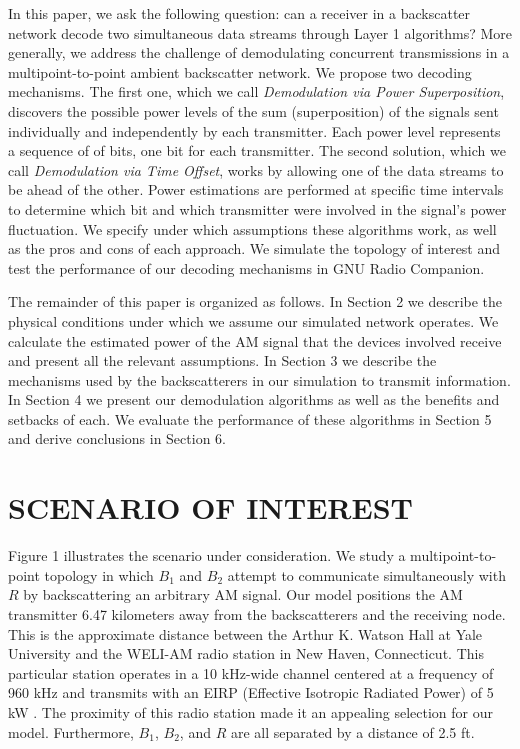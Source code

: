 \documentclass[letterpaper, 10 pt, conference]{IEEEconf}
\begin{document}
In this paper, we ask the following question: can a receiver in a backscatter network decode two simultaneous data streams through Layer 1 algorithms? More generally, we address the challenge of demodulating concurrent transmissions in a multipoint-to-point ambient backscatter network. We propose two decoding mechanisms. The first one, which we call \textit{Demodulation via Power Superposition}, discovers the possible power levels of the sum (superposition) of the signals sent individually and independently by each transmitter. Each power level represents a sequence of of bits, one bit for each transmitter. The second solution, which we call \textit{Demodulation via Time Offset}, works by allowing one of the data streams to be ahead of the other. Power estimations are performed at specific time intervals to determine which bit and which transmitter were involved in the signal's power fluctuation. We specify under which assumptions these algorithms work, as well as the pros and cons of each approach. We simulate the topology of interest and test the performance of our decoding mechanisms in GNU Radio Companion.

The remainder of this paper is organized as follows. In Section 2 we describe the physical conditions under which we assume our simulated network operates. We calculate the estimated power of the AM signal that the devices involved receive and present all the relevant assumptions. In Section 3 we describe the mechanisms used by the backscatterers in our simulation to transmit information. In Section 4 we present our demodulation algorithms as well as the benefits and setbacks of each. We evaluate the performance of these algorithms in Section 5 and derive conclusions in Section 6.

\section{SCENARIO OF INTEREST}

Figure 1 illustrates the scenario under consideration. We study a multipoint-to-point topology in which $B_1$ and $B_2$ attempt to communicate simultaneously with $R$ by backscattering an arbitrary AM signal. Our model positions the AM transmitter 6.47 kilometers away from the backscatterers and the receiving node. This is the approximate distance between the Arthur K. Watson Hall at Yale University and the WELI-AM radio station in New Haven, Connecticut. This particular station operates in a 10 kHz-wide channel centered at a frequency of 960 kHz and transmits with an EIRP (Effective Isotropic Radiated Power) of 5 kW \cite{weli_am}. The proximity of this radio station made it an appealing selection for our model. Furthermore, $B_1$, $B_2$, and $R$ are all separated by a distance of 2.5 ft.
\end{document}
